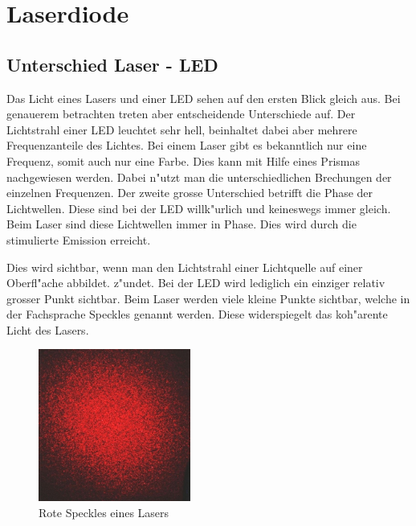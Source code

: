\begin{refsection}
\begin{flushleft}
\begin{figure}
\end{figure}
\end{flushleft}

\section{Laserdiode}
\label{Laserdiode}

\subsection{Unterschied Laser - LED}
\label{Unterschied Laser - LED}
Das Licht eines Lasers und einer LED sehen auf den ersten Blick gleich aus.
Bei genauerem betrachten treten aber entscheidende Unterschiede auf.
Der Lichtstrahl einer LED leuchtet sehr hell, beinhaltet dabei aber mehrere
Frequenzanteile des Lichtes.
Bei einem Laser gibt es bekanntlich nur eine Frequenz,
somit auch nur eine Farbe.
Dies kann mit Hilfe eines Prismas nachgewiesen werden.
Dabei n"utzt man die unterschiedlichen Brechungen der einzelnen Frequenzen.
Der zweite grosse Unterschied betrifft die Phase der Lichtwellen.
Diese sind bei der LED willk"urlich und keineswegs immer gleich.
Beim Laser sind diese Lichtwellen immer in Phase.
Dies wird durch die stimulierte Emission erreicht.

Dies wird sichtbar, wenn man den Lichtstrahl einer Lichtquelle
auf einer Oberfl"ache abbildet.
z"undet. Bei der LED wird lediglich ein einziger relativ grosser Punkt 
sichtbar. Beim Laser werden viele kleine Punkte sichtbar, welche in der
Fachsprache Speckles genannt werden. Diese widerspiegelt das koh"arente Licht
des Lasers.

\begin{figure}
\centering
\includegraphics[width = 5cm]{laser/bilder/Objective_speckle.jpg}
\caption{Rote Speckles eines Lasers \cite{WikiSpeckle}}
\end{figure}


\end{refsection}
